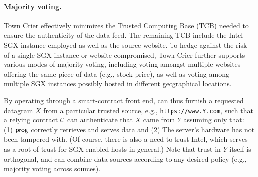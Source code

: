 \iffalse

\paragraph{Majority voting.}
Town Crier effectively minimizes the 
Trusted Computing Base (TCB) needed to ensure
the authenticity of the data feed.
The remaining TCB include the Intel SGX 
instance employed as well as the source website. 
To hedge against the risk of a single SGX instance
or website compromised, Town Crier further supports 
various modes of majority voting,  
including voting amongst multiple 
websites offering the same piece of data (e.g., stock price),  
as well as voting among multiple SGX instances possibly
hosted in different geographical locations.



By operating through a smart-contract front end, \tc can thus furnish a requested datagram $X$ from a particular trusted source, e.g., \texttt{https://www.Y.com}, such that a relying contract ${\cal C}$ can authenticate that $X$ came from $Y$ assuming only that: (1) ${\sf prog}$ correctly retrieves and serves data and (2) The \tc server's hardware has not been tampered with. (Of course, there is also a need to trust Intel, which serves as a root of trust for SGX-enabled hosts in general.) Note that trust in $Y$ itself is orthogonal, and \tc can combine data sources according to any desired policy (e.g., majority voting across sources).

